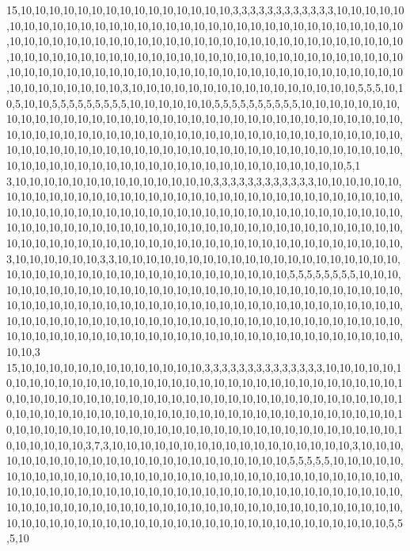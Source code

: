15,10,10,10,10,10,10,10,10,10,10,10,10,10,10,10,3,3,3,3,3,3,3,3,3,3,3,3,10,10,10,10,10,10,10,10,10,10,10,10,10,10,10,10,10,10,10,10,10,10,10,10,10,10,10,10,10,10,10,10,10,10,10,10,10,10,10,10,10,10,10,10,10,10,10,10,10,10,10,10,10,10,10,10,10,10,10,10,10,10,10,10,10,10,10,10,10,10,10,10,10,10,10,10,10,10,10,10,10,10,10,10,10,10,10,10,10,10,10,10,10,10,10,10,10,10,10,10,10,10,10,10,10,10,10,10,10,10,10,10,10,10,10,10,10,10,10,10,10,10,10,10,10,3,10,10,10,10,10,10,10,10,10,10,10,10,10,10,10,10,5,5,5,10,10,5,10,10,5,5,5,5,5,5,5,5,5,10,10,10,10,10,10,5,5,5,5,5,5,5,5,5,5,10,10,10,10,10,10,10,10,10,10,10,10,10,10,10,10,10,10,10,10,10,10,10,10,10,10,10,10,10,10,10,10,10,10,10,10,10,10,10,10,10,10,10,10,10,10,10,10,10,10,10,10,10,10,10,10,10,10,10,10,10,10,10,10,10,10,10,10,10,10,10,10,10,10,10,10,10,10,10,10,10,10,10,10,10,10,10,10,10,10,10,10,10,10,10,10,10,10,10,10,10,10,10,10,10,10,10,10,10,10,10,10,10,10,10,5,1
3,10,10,10,10,10,10,10,10,10,10,10,10,10,10,3,3,3,3,3,3,3,3,3,3,3,3,10,10,10,10,10,10,10,10,10,10,10,10,10,10,10,10,10,10,10,10,10,10,10,10,10,10,10,10,10,10,10,10,10,10,10,10,10,10,10,10,10,10,10,10,10,10,10,10,10,10,10,10,10,10,10,10,10,10,10,10,10,10,10,10,10,10,10,10,10,10,10,10,10,10,10,10,10,10,10,10,10,10,10,10,10,10,10,10,10,10,10,10,10,10,10,10,10,10,10,10,10,10,10,10,10,10,10,10,10,10,10,10,10,10,10,10,10,10,3,10,10,10,10,10,10,3,3,10,10,10,10,10,10,10,10,10,10,10,10,10,10,10,10,10,10,10,10,10,10,10,10,10,10,10,10,10,10,10,10,10,10,10,10,10,10,10,10,5,5,5,5,5,5,5,5,10,10,10,10,10,10,10,10,10,10,10,10,10,10,10,10,10,10,10,10,10,10,10,10,10,10,10,10,10,10,10,10,10,10,10,10,10,10,10,10,10,10,10,10,10,10,10,10,10,10,10,10,10,10,10,10,10,10,10,10,10,10,10,10,10,10,10,10,10,10,10,10,10,10,10,10,10,10,10,10,10,10,10,10,10,10,10,10,10,10,10,10,10,10,10,10,10,10,10,10,10,10,10,10,10,10,10,10,10,10,10,10,10,10,10,10,10,3
15,10,10,10,10,10,10,10,10,10,10,10,10,10,3,3,3,3,3,3,3,3,3,3,3,3,3,3,10,10,10,10,10,10,10,10,10,10,10,10,10,10,10,10,10,10,10,10,10,10,10,10,10,10,10,10,10,10,10,10,10,10,10,10,10,10,10,10,10,10,10,10,10,10,10,10,10,10,10,10,10,10,10,10,10,10,10,10,10,10,10,10,10,10,10,10,10,10,10,10,10,10,10,10,10,10,10,10,10,10,10,10,10,10,10,10,10,10,10,10,10,10,10,10,10,10,10,10,10,10,10,10,10,10,10,10,10,10,10,10,10,10,10,10,10,10,10,10,10,10,10,3,7,3,10,10,10,10,10,10,10,10,10,10,10,10,10,10,10,10,10,3,10,10,10,10,10,10,10,10,10,10,10,10,10,10,10,10,10,10,10,10,10,10,10,5,5,5,5,5,10,10,10,10,10,10,10,10,10,10,10,10,10,10,10,10,10,10,10,10,10,10,10,10,10,10,10,10,10,10,10,10,10,10,10,10,10,10,10,10,10,10,10,10,10,10,10,10,10,10,10,10,10,10,10,10,10,10,10,10,10,10,10,10,10,10,10,10,10,10,10,10,10,10,10,10,10,10,10,10,10,10,10,10,10,10,10,10,10,10,10,10,10,10,10,10,10,10,10,10,10,10,10,10,10,10,10,10,10,10,10,10,10,10,10,10,5,5,5,10
